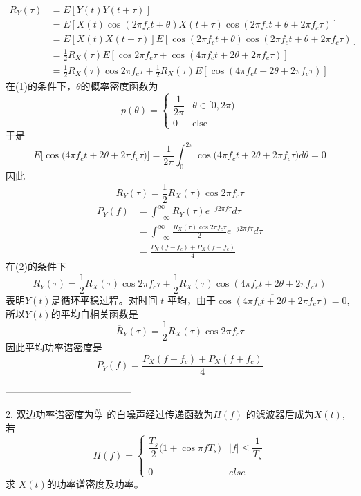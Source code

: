 \documentclass[utf8]{article}
\begin{document}
$$\begin{aligned}
R_{Y}(\tau) & =E[Y(t) Y(t+\tau)] \\
& =E\left[X(t) \cos \left(2 \pi f_{c} t+\theta\right) X(t+\tau) \cos \left(2 \pi f_{c} t+\theta+2 \pi f_{c} \tau\right)\right] \\
& =E[X(t) X(t+\tau)] E\left[\cos \left(2 \pi f_{c} t+\theta\right) \cos \left(2 \pi f_{c} t+\theta+2 \pi f_{c} \tau\right)\right] \\
& =\frac{1}{2} R_{X}(\tau) E\left[\cos 2 \pi f_{c} \tau+\cos \left(4 \pi f_{c} t+2 \theta+2 \pi f_{c} \tau\right)\right] \\
& =\frac{1}{2} R_{X}(\tau) \cos 2 \pi f_{c} \tau+\frac{1}{2} R_{X}(\tau) E\left[\cos \left(4 \pi f_{c} t+2 \theta+2 \pi f_{c} \tau\right)\right]
\end{aligned}$$
在(1)的条件下，$\theta$的概率密度函数为
$$p(\theta)=\begin{cases}\dfrac{1}{2\pi}&\theta\in[0,2\pi)\\0&\text{else}\end{cases}$$
于是
$$E\Big[\cos\Big(4\pi f_ct+2\theta+2\pi f_c\tau\Big)\Big]=\frac1{2\pi}\int_0^{2\pi}\cos\Big(4\pi f_ct+2\theta+2\pi f_c\tau\Big)d\theta=0$$
因此
$$R_Y\left(\tau\right)=\frac12R_X\left(\tau\right)\cos2\pi f_c\tau $$
$$\begin{aligned}P_{Y}\left(f\right)&=\int_{-\infty}^\infty R_Y\left(\tau\right)e^{-j2\pi f\tau}d\tau\\&=\int_{-\infty}^\infty\frac{R_X\left(\tau\right)\cos2\pi f_c\tau}2e^{-j2\pi f\tau}d\tau\\&=\frac{P_X\left(f-f_c\right)+P_X\left(f+f_c\right)}4\end{aligned}$$
在(2)的条件下
$$R_Y\left(\tau\right)=\frac12R_X\left(\tau\right)\cos2\pi f_c\tau+\frac12R_X\left(\tau\right)\cos\left(4\pi f_ct+2\theta+2\pi f_c\tau\right)$$
表明$Y(t)$是循环平稳过程。对时间 $t$ 平均，由于$\overline{\cos\left(4\pi f_ct+2\theta+2\pi f_c\tau\right)}=0$,所以$Y(t)$的平均自相关函数是
$$\overline{R}_Y\left(\tau\right)=\frac12R_X\left(\tau\right)\cos2\pi f_c\tau $$
因此平均功率谱密度是
$$P_Y\left(f\right)=\frac{P_X\left(f-f_c\right)+P_X\left(f+f_c\right)}4$$

---------------------------------------

2. 双边功率谱密度为$\frac{N_0}2$ 的白噪声经过传递函数为$H(f)$ 的滤波器后成为$X(t)$,若
$$H(f)=\begin{cases}\dfrac{T_s}{2}\Big(1+\cos\pi fT_s\Big)&\Big|f\Big|\le\dfrac{1}{T_s}\\\\0&else\end{cases}$$
求 $X(t)$的功率谱密度及功率。
\end{document}
